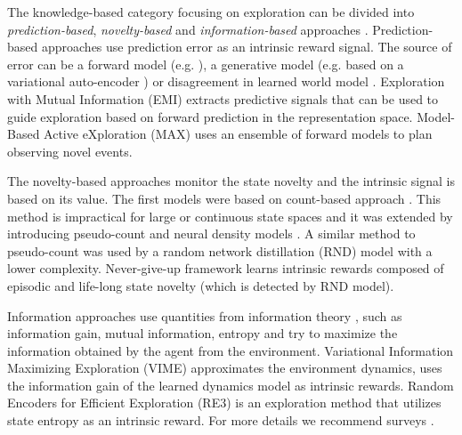 \documentclass[a4paper,11pt]{elsarticle}
\begin{document}
The knowledge-based category focusing on exploration can be divided into \textit{prediction-based}, \textit{novelty-based} and \textit{information-based} approaches \citep{aubret2019survey}.
Prediction-based approaches use prediction error as an intrinsic reward signal. The source of error can be a forward model (e.g. \cite{stadie2015incentivizing,bellemare13arcade,Pathak2017}), a generative model \cite{yu2020intrinsic} (e.g. based on a variational auto-encoder \cite{kingma2013auto}) or disagreement in learned world model \citep{sekar2020planning}. Exploration with Mutual Information (EMI) \citep{kim2018emi} extracts predictive signals that can be used to guide exploration based on forward prediction in the representation space. Model-Based Active eXploration (MAX) \citep{shyam2019model} uses an ensemble of forward models to plan observing novel events.

The novelty-based approaches monitor the state novelty and the intrinsic signal is based on its value. The first models were based on count-based approach \citep{tang2017exploration}. This method is impractical for large or continuous state spaces and it was extended by introducing pseudo-count and neural density models \citep{ostrovski2017count,martin2017count,machado2018count}. A similar method to pseudo-count was used by a random network distillation (RND) model \citep{burda2018exploration} with a lower complexity. Never-give-up framework \citep{badia2020never} learns intrinsic rewards composed of episodic and life-long state novelty (which is detected by RND model).

Information approaches use quantities from information theory \citep{shannon1948mathematical}, such as information gain, mutual information, entropy and try to maximize the information obtained by the agent from the environment. Variational Information Maximizing Exploration (VIME) \citep{houthooft2016vime} approximates the environment dynamics, uses the information gain of the learned dynamics model as intrinsic rewards. Random Encoders for Efficient Exploration (RE3) \citep{seo2021state} is an exploration method that utilizes state entropy as an intrinsic reward.
For more details we recommend surveys \cite{burda2018large, aubret2019survey, yuan2022intrinsically}.
\end{document}
